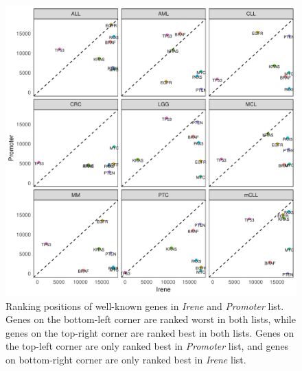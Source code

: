 \documentclass[a4paper,12pt]{article}
\begin{document}
\begin{figure}[!htb]
\centering
\includegraphics[scale=0.75]{figs/rnk.pdf}
\caption{ Ranking positions of well-known genes in {\em Irene} and {\em Promoter} list. Genes on the bottom-left corner are ranked worst in both lists, while genes on the top-right corner are ranked best in both lists. Genes on the top-left corner are only ranked best in {\em Promoter} list, and genes on bottom-right corner are only ranked best in {\em Irene} list. }
\label{fig:oncorank4}
\end{figure}
\end{document}
